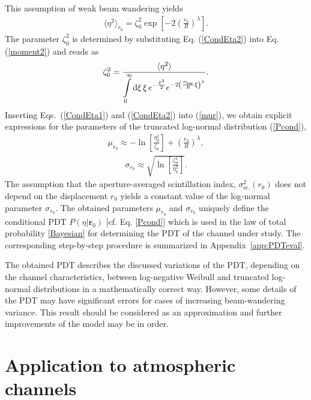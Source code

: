 \documentclass[aps,pra,twocolumn,a4paper,nofootinbib,preprintnumbers] {revtex4-1}
\newcommand{\D}{{\rm{d}}}
\begin{document}
	This assumption of weak beam wandering  yields
		\begin{align}\label{CondEta2}
		\langle\eta^2\rangle_{r_0}=\zeta_{0}^2\exp\left[-2\left(\frac{r_0}{R}\right)^{\lambda}\right].
		\end{align}
	The parameter  $\zeta_{0}^2$  is determined by substituting Eq. (\ref{CondEta2}) into Eq. (\ref{moment2}) and reads as
		\begin{align}\label{Eta2Defin}
		\zeta_0^2=\frac{\langle\eta^2\rangle}{\displaystyle{\int\limits_{0}^\infty  \D\xi\,\xi \,e^{-\frac{\xi^2}{2}}e^{-2\left(\frac{\sigma_{\mathrm{bw}}}{R}\xi\right)^{\lambda}}}}.
		\end{align}
	Inserting Eqs.~(\ref{CondEta1}) and (\ref{CondEta2}) into (\ref{mur}),  we obtain explicit expressions for the parameters of the truncated log-normal distribution (\ref{Pcond}),
		\begin{align}\label{muApprox}
		\mu_{r_0}\approx-\ln\left[\frac{\eta_0^2}{\zeta_0}\right]+\left(\frac{r_0}{R}\right)^{\lambda},
		\end{align}
		\begin{align}\label{sigmaApprox}
		\sigma_{r_0}\approx\sqrt{\ln\left[\frac{\zeta_0^2}{\eta_0^2}\right]}.
		\end{align}
	The assumption that the aperture-averaged scintillation index,  $\sigma^2_\textrm{sc.}(r_0)$ does not depend on the displacement $r_0$ yields a constant value of the log-normal parameter $ \sigma_{r_0}$.
	The obtained parameters $\mu_{r_0}$ and $\sigma_{r_0}$ uniquely define the conditional PDT $P(\eta|\boldsymbol{r}_0)$ [cf. Eq. \eqref{Pcond}] which is used in the law of total probability \eqref{Bayesian} for determining the   PDT of the channel under study.
	The corresponding step-by-step procedure is summarized in Appendix~\ref{app:PDTeval}.
	
	The obtained PDT describes the discussed variations of the PDT, depending on the channel characteristics, between log-negative Weibull and truncated log-normal distributions in a mathematically correct way.
	However, some details of the PDT may have significant errors for cases of increasing beam-wandering variance.
	This result should be considered as an approximation and further improvements of the model may be in order.
	
	
	


\section{Application to atmospheric channels}\label{sec:Applications}
\end{document}
